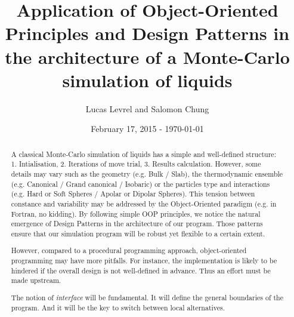 \documentclass[a4paper, 10pt]{article}
\title{Application of Object-Oriented Principles and Design Patterns in the architecture of
    a Monte-Carlo simulation of liquids}
\author{Lucas Levrel and Salomon Chung}
\date{February 17, 2015 - \today{}}
\def\buildMode{buildmissing}
\begin{document}
    \maketitle

    \begin{abstract}
        A classical Monte-Carlo simulation of liquids has a simple and well-defined structure:
        1. Intialisation, 2. Iterations of move trial, 3. Results calculation.
        However, some details may vary such as the geometry (e.g. Bulk / Slab),
        the thermodynamic ensemble (e.g. Canonical / Grand canonical / Isobaric)
        or the particles type and interactions (e.g. Hard or Soft Spheres /
        Apolar or Dipolar Spheres).
        This tension between constance and variability may be addressed by
        the Object-Oriented paradigm (e.g. in Fortran, no kidding).
        By following simple OOP principles, we notice the natural emergence of Design Patterns
        in the architecture of our program.
        Those patterns ensure that our simulation program will be robust yet flexible
        to a certain extent.

        However, compared to a procedural programming approach, object-oriented programming
        may have more pitfalls.
        For instance, the implementation is likely to be hindered if the overall design is
        not well-defined in advance. Thus an effort must be made upstream.

        The notion of \emph{interface} will be fundamental. It will define the general boundaries of
        the program. And it will be the key to switch between local alternatives.
    \end{abstract}

    \begin{landscape}
        \begin{figure}[htb]
            \centering
            
            \caption{}
        \end{figure}
    \end{landscape}

    \begin{landscape}
        \begin{figure}[htb]
            \centering
            
            \caption{}
        \end{figure}
    \end{landscape}
\end{document}
